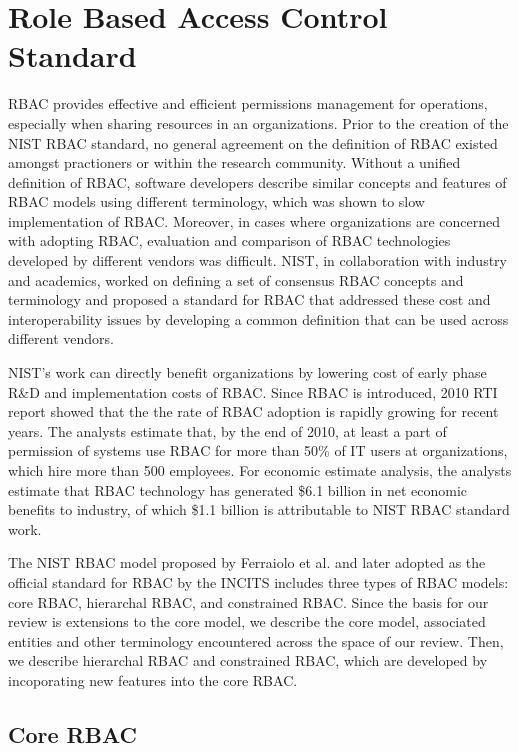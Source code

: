 \section{Role Based Access Control Standard} \label{sec:core-rbac}

RBAC provides effective and efficient permissions management for operations, especially when sharing resources in an organizations.
Prior to the creation of the NIST RBAC standard, no general agreement on the definition 
of RBAC existed amongst practioners or within the research community. 
Without a unified definition of RBAC, software developers describe similar concepts and features of RBAC models using different terminology, which was shown to slow implementation of RBAC.  
Moreover, in cases where organizations are concerned with adopting RBAC,
evaluation and comparison of RBAC technologies developed by different vendors was difficult.
NIST, in collaboration with industry and academics, worked on defining a set of consensus RBAC concepts and terminology and proposed a standard for RBAC that addressed these cost and interoperability issues by developing a common definition that can be used across different vendors.

NIST's work can directly benefit organizations by lowering cost of early phase R\&D and implementation costs of RBAC.
Since RBAC is introduced, 2010 RTI report showed that the the rate of RBAC adoption is rapidly growing for recent years. 
The analysts estimate that, by the end of 2010, at least a part of permission of systems use RBAC for more than 50\% of IT users at organizations, which
hire more than 500 employees. For economic estimate analysis, the analysts estimate that RBAC technology has generated \$6.1 billion in net economic benefits to industry, of which \$1.1 billion is attributable to NIST RBAC standard work.

The NIST RBAC model proposed by Ferraiolo et al. \cite{ferraiolo} and later adopted as the official standard for RBAC by the INCITS includes three types of RBAC models: core RBAC, hierarchal RBAC, and constrained RBAC.
Since the basis for our review is extensions to the core model, we describe the core model, associated entities and other terminology encountered across the space of our review. Then, we describe hierarchal RBAC and constrained RBAC, which are developed by incoporating new features into the core RBAC. 

\subsection{Core RBAC} 

